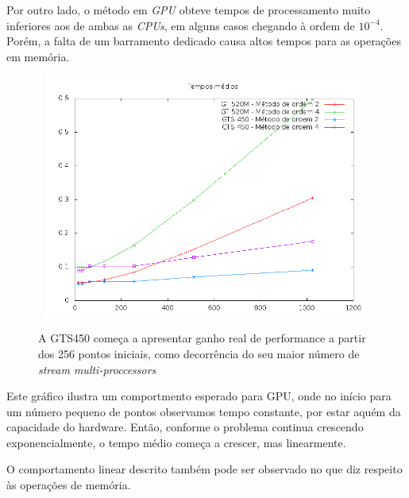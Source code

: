   \newpage
  Por outro lado, o método em \textit{GPU} obteve tempos de processamento muito inferiores aos de ambas as \textit{CPUs}, em alguns casos chegando à ordem de $10^{-4}$. Porém, a falta de um barramento dedicado causa altos tempos para as operações em memória.
  
  \begin{figure}[!h]
    \begin{center}
       \includegraphics[width=120mm, height=80mm]{images/gpu-means-double.png}
       \label{fig:gpu-means-double}
       \caption{A GTS450 começa a apresentar ganho real de performance a partir dos 256 pontos iniciais, como decorrência do seu maior número de \textit{stream multi-proccessors}}
    \end{center}
  \end{figure}
  
  Este gráfico ilustra um comportmento esperado para GPU, onde no início para um número pequeno de pontos observamos tempo constante, por estar aquém da capacidade do hardware. Então, conforme o problema continua crescendo exponencialmente, o tempo médio começa a crescer, mas linearmente.
  
  \newpage
  O comportamento linear descrito também pode ser observado no que diz respeito às operações de memória.
  
